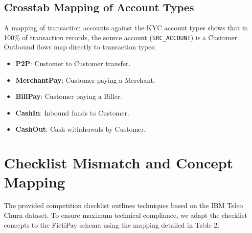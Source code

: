 \documentclass[11pt,a4paper]{article}
\begin{document}
\subsection{Crosstab Mapping of Account Types}
A mapping of transaction accounts against the KYC account types shows that in 100\% of transaction records, the source account (\texttt{SRC\_ACCOUNT}) is a Customer. Outbound flows map directly to transaction types:
\begin{itemize}
    \item \textbf{P2P}: Customer to Customer transfer.
    \item \textbf{MerchantPay}: Customer paying a Merchant.
    \item \textbf{BillPay}: Customer paying a Biller.
    \item \textbf{CashIn}: Inbound funds to Customer.
    \item \textbf{CashOut}: Cash withdrawals by Customer.
\end{itemize}

\section{Checklist Mismatch and Concept Mapping}
The provided competition checklist outlines techniques based on the IBM Telco Churn dataset. To ensure maximum technical compliance, we adapt the checklist concepts to the FictiPay schema using the mapping detailed in Table 2.
\end{document}
